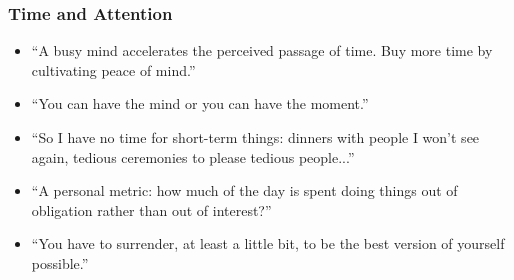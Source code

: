 \begin{frame}[fragile]\frametitle{Time and Attention}
      \begin{itemize}
        \item “A busy mind accelerates the perceived passage of time. Buy more time by cultivating peace of mind.”
        \item “You can have the mind or you can have the moment.”
        \item “So I have no time for short-term things: dinners with people I won’t see again, tedious ceremonies to please tedious people...”
        \item “A personal metric: how much of the day is spent doing things out of obligation rather than out of interest?”
        \item “You have to surrender, at least a little bit, to be the best version of yourself possible.”
      \end{itemize}
\end{frame}

